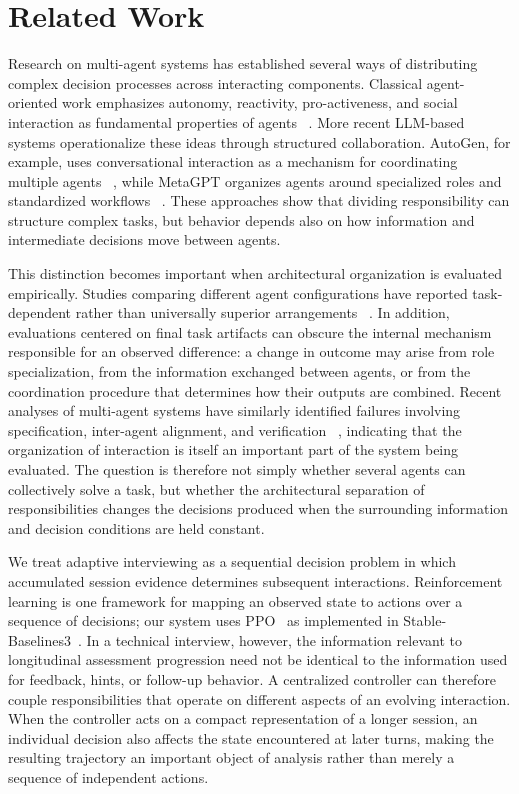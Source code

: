 \section{Related Work}\label{sec:related}

Research on multi-agent systems has established several ways of distributing complex decision processes across interacting components. Classical agent-oriented work emphasizes autonomy, reactivity, pro-activeness, and social interaction as fundamental properties of agents ~\cite{wj95}. More recent LLM-based systems operationalize these ideas through structured collaboration. AutoGen, for example, uses conversational interaction as a mechanism for coordinating multiple agents ~\cite{autogen}, while MetaGPT organizes agents around specialized roles and standardized workflows ~\cite{metagpt}. These approaches show that dividing responsibility can structure complex tasks, but behavior depends also on how information and intermediate decisions move between agents.

This distinction becomes important when architectural organization is evaluated empirically. Studies comparing different agent configurations have reported task-dependent rather than universally superior arrangements ~\cite{kim2026artifact,kim2026capable}. In addition, evaluations centered on final task artifacts can obscure the internal mechanism responsible for an observed difference: a change in outcome may arise from role specialization, from the information exchanged between agents, or from the coordination procedure that determines how their outputs are combined. Recent analyses of multi-agent systems have similarly identified failures involving specification, inter-agent alignment, and verification ~\cite{mast}, indicating that the organization of interaction is itself an important part of the system being evaluated. The question is therefore not simply whether several agents can collectively solve a task, but whether the architectural separation of responsibilities changes the decisions produced when the surrounding information and decision conditions are held constant.

We treat adaptive interviewing as a sequential decision problem in which accumulated session evidence determines subsequent interactions. Reinforcement learning is one framework for mapping an observed state to actions over a sequence of decisions; our system uses PPO~\cite{ppo} as implemented in Stable-Baselines3~\cite{sb3}. In a technical interview, however, the information relevant to longitudinal assessment progression need not be identical to the information used for feedback, hints, or follow-up behavior. A centralized controller can therefore couple responsibilities that operate on different aspects of an evolving interaction. When the controller acts on a compact representation of a longer session, an individual decision also affects the state encountered at later turns, making the resulting trajectory an important object of analysis rather than merely a sequence of independent actions.

